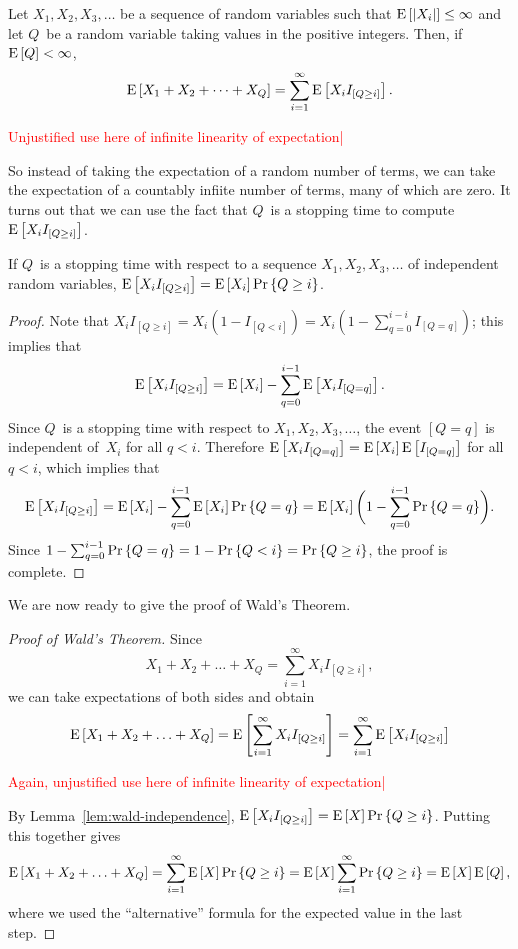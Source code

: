 \documentclass[11pt,twoside]{article}
\begin{document}
\begin{corollary}
  Let $X_1, X_2, X_3, \dots$ be a sequence of random variables such
  that $\mathop{\textup{E}}\nolimits\left[\left|X_i\right|\right] \leq \infty$ and let $Q$~be a random variable
  taking values in the positive integers.  Then, if $\mathop{\textup{E}}\nolimits\left[Q\right] < \infty$,
\[
    \mathop{\textup{E}}\nolimits\left[X_1 + X_2 + \dots + X_Q\right]
    = \sum_{i=1}^{\infty} \mathop{\textup{E}}\nolimits\left[X_i I_{[Q \geq i]}\right].
\]

\begin{editingnotes}
\textcolor{red}{Unjustified use here of infinite linearity of expectation|}
\end{editingnotes}
\end{corollary}

So instead of taking the expectation of a random number of terms, we
can take the expectation of a countably infiite number of terms, many
of which are zero.  It turns out that we can use the fact that $Q$~is a
stopping time to compute $\mathop{\textup{E}}\nolimits\left[X_i I_{[Q \geq i]}\right]$.
\begin{lemma}
  \label{lem:wald-independence}
  If $Q$~is a stopping time with respect to a sequence $X_1, X_2, X_3,
  \dots$ of independent random variables, $\mathop{\textup{E}}\nolimits\left[X_i I_{[Q \geq i]}\right]
  = \mathop{\textup{E}}\nolimits\left[X_i\right] \mathop{\textup{Pr}}\nolimits\left\{Q \geq i\right\}$.
\end{lemma}
\begin{proof}
  Note that $X_i I_{[Q \geq i]} = X_i (1-I_{[Q < i]}) = X_i (1 -
  \sum_{q=0}^{i-i}I_{[Q = q]})$; this implies that
\[
    \mathop{\textup{E}}\nolimits\left[X_i I_{[Q \geq i]}\right] =
    \mathop{\textup{E}}\nolimits\left[X_i\right] - \sum_{q=0}^{i-1} \mathop{\textup{E}}\nolimits\left[X_i I_{[Q = q]}\right].
\]
  Since $Q$~is a stopping time with respect to $X_1, X_2, X_3,
  \ldots$, the event $[Q = q]$ is independent of~$X_i$ for all $q <
  i$.  Therefore $\mathop{\textup{E}}\nolimits\left[X_i I_{[Q = q]}\right] = \mathop{\textup{E}}\nolimits\left[X_i\right] \mathop{\textup{E}}\nolimits\left[I_{[Q = q]}\right]$
  for all $q < i$, which implies that
\[
    \mathop{\textup{E}}\nolimits\left[X_i I_{[Q \geq i]}\right] =
    \mathop{\textup{E}}\nolimits\left[X_i\right] - \sum_{q=0}^{i-1} \mathop{\textup{E}}\nolimits\left[X_i\right] \mathop{\textup{Pr}}\nolimits\left\{Q = q\right\} =
    \mathop{\textup{E}}\nolimits\left[X_i\right]\biggl(1 - \sum_{q=0}^{i-1} \mathop{\textup{Pr}}\nolimits\left\{Q = q\right\}\biggr).
\]
  Since $1 - \sum_{q=0}^{i-1} \mathop{\textup{Pr}}\nolimits\left\{Q = q\right\} = 1 - \mathop{\textup{Pr}}\nolimits\left\{Q < i\right\} = \mathop{\textup{Pr}}\nolimits\left\{Q
  \geq i\right\}$, the proof is complete.
\end{proof}
We are now ready to give the proof of Wald's Theorem.
\begin{proof}[Proof of Wald's Theorem]
Since
\[
    X_1 + X_2 + \ldots + X_Q = \sum_{i=1}^{\infty} X_i I_{[Q \geq i]},
\]
we can take expectations of both sides and obtain
\[
\mathop{\textup{E}}\nolimits\left[X_1 + X_2 + \ldots + X_Q\right] = \mathop{\textup{E}}\nolimits\left[\sum_{i=1}^{\infty} X_i I_{[Q \geq i]}\right]
= \sum_{i=1}^{\infty} \mathop{\textup{E}}\nolimits\left[X_i I_{[Q \geq i]}\right]
\]

\begin{editingnotes}
\textcolor{red}{Again, unjustified use here of infinite linearity of expectation|}
\end{editingnotes}

  By Lemma~\ref{lem:wald-independence}, $\mathop{\textup{E}}\nolimits\left[X_i I_{[Q \geq i]}\right] =
  \mathop{\textup{E}}\nolimits\left[X\right] \mathop{\textup{Pr}}\nolimits\left\{Q \geq i\right\}$.  Putting this together gives
\[
\mathop{\textup{E}}\nolimits\left[X_1 + X_2 + \ldots + X_Q\right]
    =  \sum_{i=1}^{\infty} \mathop{\textup{E}}\nolimits\left[X\right] \mathop{\textup{Pr}}\nolimits\left\{Q \geq i\right\}
    =  \mathop{\textup{E}}\nolimits\left[X\right] \sum_{i=1}^{\infty} \mathop{\textup{Pr}}\nolimits\left\{Q \geq i\right\}
    =  \mathop{\textup{E}}\nolimits\left[X\right] \mathop{\textup{E}}\nolimits\left[Q\right],
\]
  where we used the ``alternative'' formula for the expected value in
  the last step.
\end{proof}
\end{document}
